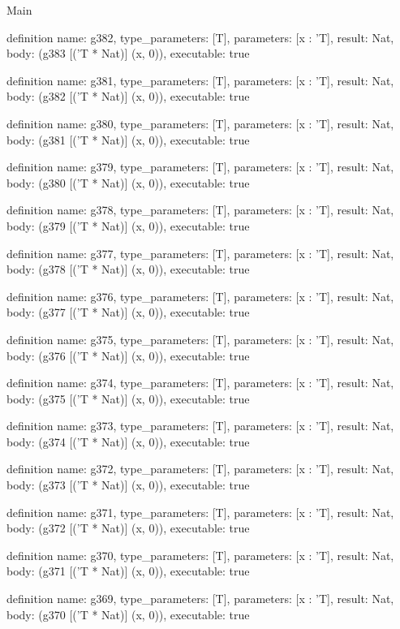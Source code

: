 \begin{lexlean}{Main}
\begin{semanticmodule}
definition{
  name: g382,
  type_parameters: [T],
  parameters: [x : 'T],
  result: Nat,
  body: (g383 [('T * Nat)] (x, 0)),
  executable: true
}

definition{
  name: g381,
  type_parameters: [T],
  parameters: [x : 'T],
  result: Nat,
  body: (g382 [('T * Nat)] (x, 0)),
  executable: true
}

definition{
  name: g380,
  type_parameters: [T],
  parameters: [x : 'T],
  result: Nat,
  body: (g381 [('T * Nat)] (x, 0)),
  executable: true
}

definition{
  name: g379,
  type_parameters: [T],
  parameters: [x : 'T],
  result: Nat,
  body: (g380 [('T * Nat)] (x, 0)),
  executable: true
}

definition{
  name: g378,
  type_parameters: [T],
  parameters: [x : 'T],
  result: Nat,
  body: (g379 [('T * Nat)] (x, 0)),
  executable: true
}

definition{
  name: g377,
  type_parameters: [T],
  parameters: [x : 'T],
  result: Nat,
  body: (g378 [('T * Nat)] (x, 0)),
  executable: true
}

definition{
  name: g376,
  type_parameters: [T],
  parameters: [x : 'T],
  result: Nat,
  body: (g377 [('T * Nat)] (x, 0)),
  executable: true
}

definition{
  name: g375,
  type_parameters: [T],
  parameters: [x : 'T],
  result: Nat,
  body: (g376 [('T * Nat)] (x, 0)),
  executable: true
}

definition{
  name: g374,
  type_parameters: [T],
  parameters: [x : 'T],
  result: Nat,
  body: (g375 [('T * Nat)] (x, 0)),
  executable: true
}

definition{
  name: g373,
  type_parameters: [T],
  parameters: [x : 'T],
  result: Nat,
  body: (g374 [('T * Nat)] (x, 0)),
  executable: true
}

definition{
  name: g372,
  type_parameters: [T],
  parameters: [x : 'T],
  result: Nat,
  body: (g373 [('T * Nat)] (x, 0)),
  executable: true
}

definition{
  name: g371,
  type_parameters: [T],
  parameters: [x : 'T],
  result: Nat,
  body: (g372 [('T * Nat)] (x, 0)),
  executable: true
}

definition{
  name: g370,
  type_parameters: [T],
  parameters: [x : 'T],
  result: Nat,
  body: (g371 [('T * Nat)] (x, 0)),
  executable: true
}

definition{
  name: g369,
  type_parameters: [T],
  parameters: [x : 'T],
  result: Nat,
  body: (g370 [('T * Nat)] (x, 0)),
  executable: true
}


\end{semanticmodule}
\end{lexlean}
